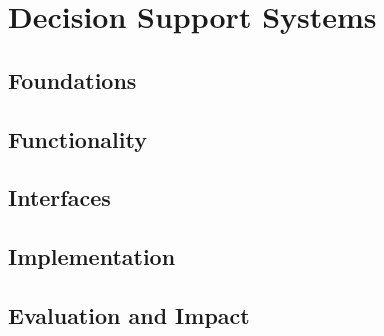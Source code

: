 \chapter{Decision Support Systems}
\label{ChapterThree}

\section{Foundations}
\label{sec:Foundations}

\section{Functionality}
\label{sec:Functionality}

\section{Interfaces}
\label{sec:Interfaces}

\section{Implementation}
\label{sec:Implementation}

\section{Evaluation and Impact}
\label{sec:EvaluationAndImpact}